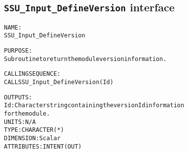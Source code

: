 \subsection{\texttt{SSU\_Input\_DefineVersion} interface}
  \label{sec:SSU_Input_DefineVersion_interface}
  \begin{alltt}
 
  NAME:
        SSU_Input_DefineVersion
 
  PURPOSE:
        Subroutine to return the module version information.
 
  CALLING SEQUENCE:
        CALL SSU_Input_DefineVersion( Id )
 
  OUTPUTS:
        Id:            Character string containing the version Id information
                       for the module.
                       UNITS:      N/A
                       TYPE:       CHARACTER(*)
                       DIMENSION:  Scalar
                       ATTRIBUTES: INTENT(OUT)
 
  \end{alltt}
